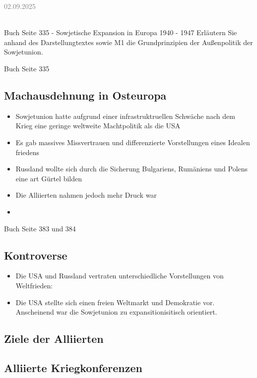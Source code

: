 \documentclass[11pt,a4paper,oneside]{article}
\newcommand{\lessondate}[1]{
	\noindent\hfill\textcolor{gray}{\textsc{#1}} \\
	\vspace{0.5cm}
}
\begin{document}
	\newpage
	
	\lessondate{02.09.2025}\\
	
	\begin{histaufgabe}{Buch Seite 335 - Sowjetische Expansion in Europa 1940 - 1947}
		Erläutern Sie anhand des Darstellungtextes sowie M1 die Grundprinzipien der Außenpolitik der Sowjetunion. 
	\end{histaufgabe}
	
	
	\begin{histloesung}{Buch Seite 335}
		\subsection*{Machausdehnung in Osteuropa}
		\begin{itemize}
			\item Sowjetunion hatte aufgrund einer infrastruktruellen Schwäche nach dem Krieg eine geringe weltweite Machtpolitik als die USA 
			\item Es gab massives Missvertrauen und differenzierte Vorstellungen eines Idealen friedens 
			\item Russland wollte sich durch die Sicherung Bulgariens, Rumäniens und Polens eine art Gürtel bilden
			\item Die Alliierten nahmen jedoch mehr Druck war
			\item 
		\end{itemize}
	\end{histloesung}
	
	\begin{histloesung}{Buch Seite 383 und 384} 
		\subsection*{Kontroverse}
		\begin{itemize}
			\item Die USA und Russland vertraten unterschiedliche Vorstellungen von Weltfrieden: 
			\item Die USA stellte sich einen freien Weltmarkt und Demokratie vor. Anscheinend war die Sowjetunion zu expansitionisitisch orientiert. 
		\end{itemize}
		\subsection*{Ziele der Alliierten}
		\subsection*{Alliierte Kriegkonferenzen}
	\end{histloesung}
	
\end{document}
